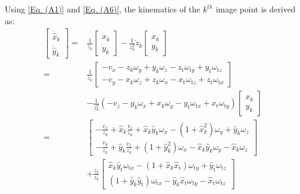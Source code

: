 \documentclass[lettersize,journal]{IEEEtran}
\begin{document}
Using \eqref{Eq. (A1)} and \eqref{Eq. (A6)}, the kinematics of the $k^{th}$ image point is derived as:
\begin{align} \label{Eq. (A7)}
    \begin{bmatrix} \dot{\hat{x}}_{k} \\ \dot{\hat{y}}_{k} \end{bmatrix}
    =& \frac{1}{z_{k}} \begin{bmatrix} \dot{x}_{k} \\ \dot{y}_{k} \end{bmatrix} - \frac{1}{z_{k}^2} \dot{z}_{k} \begin{bmatrix} x_{k} \\ y_{k} \end{bmatrix} \nonumber \\
    =& \frac{1}{z_{k}} \begin{bmatrix} - v_{x} - z_{k} \omega_{y} + y_{k} \omega_{z} - z_{\text{t}} \omega_{{\text{t}}y} + y_{\text{t}} \omega_{{\text{t}}z} \\ - v_{y} - x_{k} \omega_{z} + z_{k} \omega_{x} - x_{\text{t}} \omega_{\text{t}z} + z_{\text{t}} \omega_{\text{t}x} \end{bmatrix} \nonumber \\ 
    &- \frac{1}{z_{k}^2} \left( - v_{z} - y_{k} \omega_{x} + x_{k} \omega_{y} - y_{\text{t}} \omega_{\text{t}x} + x_{\text{t}} \omega_{\text{t}y} \right) \begin{bmatrix} x_{k} \\ y_{k} \end{bmatrix} \nonumber \\
    =& \begin{bmatrix} - \frac{v_{x}}{z_{k}} + \hat{x}_{k} \frac{v_{z}}{z_{k}} + \hat{x}_{k} \hat{y}_{k} \omega_{x} - (1 + \hat{x}_{k}^2) \omega_{y} + \hat{y}_{k}\omega_z \\
    - \frac{v_{y}}{z_{k}} + \hat{y}_{k} \frac{v_{z}}{z_{k}} + (1 + \hat{y}_{k}^2) \omega_{x} - \hat{x}_{k} \hat{y}_{k} \omega_{y} - \hat{x}_{k} \omega_z \end{bmatrix} \nonumber \\
    &+ \frac{z_{\text{t}}}{z_{k}} \begin{bmatrix}
         \hat{x}_{k} \hat{y}_{\text{t}} \omega_{\text{t}x} - (1 + \hat{x}_{k} \hat{x}_{\text{t}}) \omega_{\text{t}y} + \hat{y}_{\text{t}}\omega_{\text{t}z} \\
         (1 + \hat{y}_{k} \hat{y}_{\text{t}}) \omega_{\text{t}x} - \hat{y}_{k} \hat{x}_{\text{t}} \omega_{\text{t}y} - \hat{x}_{\text{t}} \omega_{\text{t}z}
    \end{bmatrix}
\end{align}
\end{document}

